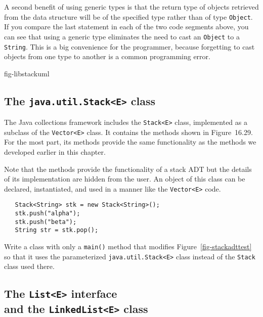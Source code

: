 A second benefit of using generic types is that the return type of
objects retrieved from the data structure will be of the specified
type rather than of type {\tt Object}.  If you compare the last
statement in each of the two code segments above, you can see that
using a generic type eliminates the need to cast an {\tt Object} to a
{\tt String}.  This is a big convenience for the programmer, because
forgetting to cast objects from one type to another is a common
programming error.

{fig-libstackuml}

\subsection*{The {\tt java.util.Stack<E>} class}

The Java collections framework includes the {\tt Stack<E>} class,
implemented as a subclass of the {\tt Vector<E>} class.  It contains
the methods shown in Figure~16.29.  For the most part, its methods
provide the same functionality as the methods we developed earlier in
this chapter.  


\noindent Note that the methods provide the functionality of a stack ADT but the
details of its implementation are hidden from the user.  An object of
this class can be declared, instantiated, and used in a manner 
like the {\tt Vector<E>} code.

\begin{jjjlisting}
\begin{lstlisting}
   Stack<String> stk = new Stack<String>();
   stk.push("alpha");
   stk.push("beta");
   String str = stk.pop();
\end{lstlisting}
\end{jjjlisting}

\label{self-study-exercise}
\begin{SSTUDY}

\item  Write a class with only a {\tt main()} method
that modifies Figure~\ref{fig-stackadttest} so that it uses the parameterized
{\tt java.util.Stack<E>} class instead of the {\tt Stack} class used there.
\end{SSTUDY}

\subsection{The {\tt List<E>} interface \\and the {\tt LinkedList<E>} class}

